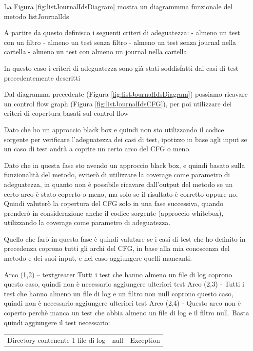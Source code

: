 \documentclass[12pt, a4paper]{article}
\begin{document}
La Figura \ref{fig:listJournalIdsDiagram} mostra un diagrammma 
funzionale del metodo listJournalIds

A partire da questo definisco i seguenti criteri di adeguatezza:
- almeno un test con un filtro
- almeno un test senza filtro
- almeno un test senza journal nella cartella
- almeno un test con almeno un journal nella cartella

In questo caso i criteri di adeguatezza sono già stati soddisfatti 
dai casi di test precedentemente descritti


Dal diagramma precedente (Figura \ref{fig:listJournalIdsDiagram}) possiamo 
ricavare un control flow graph (Figura \ref{fig:listJournalIdsCFG}), per poi
utilizzare dei criteri di copertura basati sul control flow

Dato che ho un approccio black box e quindi non sto utilizzando il codice sorgente per verificare l'adeguatezza dei casi di test,
ipotizzo in base agli input se un caso di test andrà a coprire un certo arco del CFG o meno.

Dato che in questa fase sto avendo un approccio black box, e quindi basato sulla funzionalità del metodo, 
eviterò di utilizzare la coverage come parametro di adeguatezza, in quanto non è possibile ricavare
dall'output del metodo se un certo arco è stato coperto o meno, ma solo se il risultato è corretto oppure no.
Quindi valuterò la copertura del CFG solo in una fase successiva, quando prenderò in considerazione
anche il codice sorgente (approccio whitebox), utilizzando la coverage come parametro di adeguatezza.

Quello che farò in questa fase è quindi valutare se i casi di test che ho definito in precedenza
coprono tutti gli archi del CFG, in base alla mia conoscenza del metodo e dei suoi input, e nel caso
aggiungere quelli mancanti.


Arco (1,2)  -- textgreater Tutti i test che hanno almeno un file di log coprono questo caso, quindi non è necessario aggiungere ulteriori test
Arco (2,3)  - \> Tutti i test che hanno almeno un file di log e un filtro non null coprono questo caso, quindi non è necessario aggiungere ulteriori test
Arco (2,4)  -\> 
Questo arco non è coperto perchè manca un test che abbia almeno un file di log e il filtro null. Basta quindi aggiungere il 
test necessario:
\begin{table}[ht]
  \centering
  \begin{tabular}{|c|c|c|}
  \hline
    {Directory contenente 1 file di log} & null & Exception \\
  \end{tabular}
\end{table}
\end{document}
